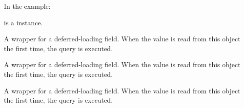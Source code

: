 \documentclass[letterpaper,10pt,english]{sphinxmanual}
\begin{document}
\begin{fulllineitems}
\begin{fulllineitems}
In the example:

\begin{sphinxVerbatim}[commandchars=\\\{\}]
 
       
\end{sphinxVerbatim}

 is a  instance.

\end{fulllineitems}


\begin{fulllineitems}
\label{\detokenize{modules/models:preferences.models.HistoricalPaymentMethod.history_user_id}}
A wrapper for a deferred-loading field. When the value is read from this
object the first time, the query is executed.

\end{fulllineitems}


\begin{fulllineitems}
\label{\detokenize{modules/models:preferences.models.HistoricalPaymentMethod.icon}}
A wrapper for a deferred-loading field. When the value is read from this
object the first time, the query is executed.

\end{fulllineitems}


\begin{fulllineitems}
\label{\detokenize{modules/models:preferences.models.HistoricalPaymentMethod.id}}
A wrapper for a deferred-loading field. When the value is read from this
object the first time, the query is executed.


\end{fulllineitems}
\end{fulllineitems}
\end{document}
